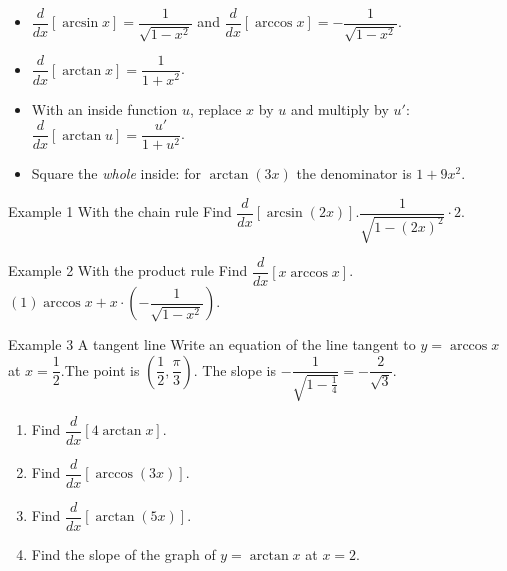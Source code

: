 \documentclass[11pt]{article}
\begin{document}

\begin{ideabox}
\begin{itemize}[leftmargin=*,itemsep=2pt,topsep=2pt]
  \item $\dfrac{d}{dx}[\arcsin x]=\dfrac{1}{\sqrt{1-x^2}}$ \quad and \quad $\dfrac{d}{dx}[\arccos x]=-\dfrac{1}{\sqrt{1-x^2}}$.
  \item $\dfrac{d}{dx}[\arctan x]=\dfrac{1}{1+x^2}$.
  \item With an inside function $u$, replace $x$ by $u$ and multiply by $u'$: \ $\dfrac{d}{dx}[\arctan u]=\dfrac{u'}{1+u^2}$.
  \item Square the \emph{whole} inside: for $\arctan(3x)$ the denominator is $1+9x^2$.
\end{itemize}
\end{ideabox}

\begin{example}{Example 1 \textperiodcentered{} With the chain rule}
Find $\dfrac{d}{dx}[\arcsin(2x)]$.\soln $\dfrac{1}{\sqrt{1-(2x)^2}}\cdot2$.
\end{example}

\begin{example}{Example 2 \textperiodcentered{} With the product rule}
Find $\dfrac{d}{dx}[x\arccos x]$.\soln $(1)\arccos x+x\cdot\left(-\dfrac{1}{\sqrt{1-x^2}}\right)$.
\end{example}

\begin{example}{Example 3 \textperiodcentered{} A tangent line}
Write an equation of the line tangent to $y=\arccos x$ at $x=\dfrac12$.\soln The point is $\left(\dfrac12,\dfrac\pi3\right)$. The slope is $-\dfrac{1}{\sqrt{1-\frac14}}=-\dfrac{2}{\sqrt3}$.
\end{example}

\newpage
{}

\begin{enumerate}[leftmargin=*,itemsep=2pt]
  \item Find $\dfrac{d}{dx}[4\arctan x]$.\work{2.3cm}
  \item Find $\dfrac{d}{dx}[\arccos(3x)]$.\work{2.3cm}
  \item Find $\dfrac{d}{dx}[\arctan(5x)]$.\work{2.3cm}
  \item Find the slope of the graph of $y=\arctan x$ at $x=2$.\work{2.3cm}
\end{enumerate}
\end{document}
